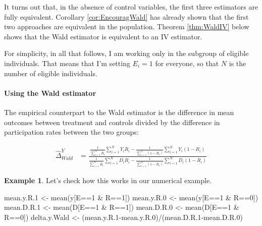 \documentclass[
]{book}
\newenvironment{Shaded}{\begin{snugshade}}{\end{snugshade}}
\newcommand{\DecValTok}[1]{\textcolor[rgb]{0.00,0.00,0.81}{#1}}
\newcommand{\FloatTok}[1]{\textcolor[rgb]{0.00,0.00,0.81}{#1}}
\newcommand{\FunctionTok}[1]{\textcolor[rgb]{0.00,0.00,0.00}{#1}}
\newcommand{\NormalTok}[1]{#1}
\newcommand{\OtherTok}[1]{\textcolor[rgb]{0.56,0.35,0.01}{#1}}
\newcommand{\SpecialCharTok}[1]{\textcolor[rgb]{0.00,0.00,0.00}{#1}}
\theoremstyle{definition}
\theoremstyle{definition}
\newtheorem{example}{Example}[chapter]
\theoremstyle{definition}
\theoremstyle{definition}
\theoremstyle{remark}
\begin{document}
It turns out that, in the absence of control variables, the first three estimators are fully equivalent.
Corollary \ref{cor:EncouragWald} has already shown that the first two approaches are equivalent in the population.
Theorem \ref{thm:WaldIV} below shows that the Wald estimator is equivalent to an IV estimator.

For simplicity, in all that follows, I am working only in the subgroup of eligible individuals.
That means that I'm setting \(E_i=1\) for everyone, so that \(N\) is the number of eligible individuals.

\hypertarget{using-the-wald-estimator}{%
\paragraph{Using the Wald estimator}\label{using-the-wald-estimator}}

The empirical counterpart to the Wald estimator is the difference in mean outcomes between treatment and controls divided by the difference in participation rates between the two groups:

\begin{align*}
\hat{\Delta}^Y_{Wald} & = \frac{\frac{1}{\sum_{i=1}^N R_i}\sum_{i=1}^N Y_iR_i-\frac{1}{\sum_{i=1}^N (1-R_i)}\sum_{i=1}^N Y_i(1-R_i)}{\frac{1}{\sum_{i=1}^N R_i}\sum_{i=1}^N D_iR_i-\frac{1}{\sum_{i=1}^N (1-R_i)}\sum_{i=1}^N D_i(1-R_i)}
\end{align*}

\begin{example}
\protect\hypertarget{exm:unnamed-chunk-121}{}{\label{exm:unnamed-chunk-121} }Let's check how this works in our numerical example.
\end{example}

\begin{Shaded}
\begin{Highlighting}[]
\NormalTok{mean.y.R}\FloatTok{.1} \OtherTok{\textless{}{-}} \FunctionTok{mean}\NormalTok{(y[E}\SpecialCharTok{==}\DecValTok{1} \SpecialCharTok{\&}\NormalTok{ R}\SpecialCharTok{==}\DecValTok{1}\NormalTok{])}
\NormalTok{mean.y.R}\FloatTok{.0} \OtherTok{\textless{}{-}} \FunctionTok{mean}\NormalTok{(y[E}\SpecialCharTok{==}\DecValTok{1} \SpecialCharTok{\&}\NormalTok{ R}\SpecialCharTok{==}\DecValTok{0}\NormalTok{])}
\NormalTok{mean.D.R}\FloatTok{.1} \OtherTok{\textless{}{-}} \FunctionTok{mean}\NormalTok{(D[E}\SpecialCharTok{==}\DecValTok{1} \SpecialCharTok{\&}\NormalTok{ R}\SpecialCharTok{==}\DecValTok{1}\NormalTok{])}
\NormalTok{mean.D.R}\FloatTok{.0} \OtherTok{\textless{}{-}} \FunctionTok{mean}\NormalTok{(D[E}\SpecialCharTok{==}\DecValTok{1} \SpecialCharTok{\&}\NormalTok{ R}\SpecialCharTok{==}\DecValTok{0}\NormalTok{])}
\NormalTok{delta.y.Wald }\OtherTok{\textless{}{-}}\NormalTok{ (mean.y.R}\FloatTok{.1}\SpecialCharTok{{-}}\NormalTok{mean.y.R}\FloatTok{.0}\NormalTok{)}\SpecialCharTok{/}\NormalTok{(mean.D.R}\FloatTok{.1}\SpecialCharTok{{-}}\NormalTok{mean.D.R}\FloatTok{.0}\NormalTok{)}
\end{Highlighting}
\end{Shaded}
\end{document}
